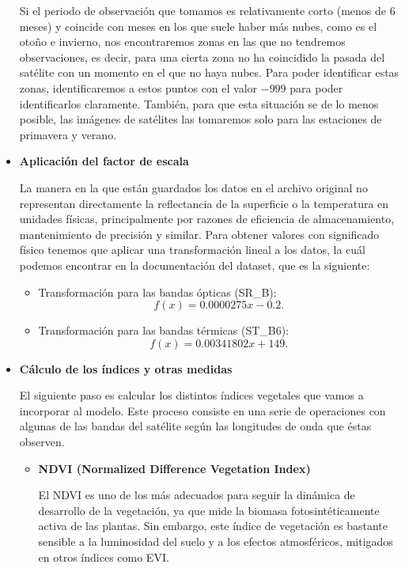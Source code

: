\begin{itemize}
    Si el periodo de observación que tomamos es relativamente corto (menos de 6 meses) y coincide con meses en los que suele haber más nubes, como es el otoño e invierno, nos encontraremos zonas en las que no tendremos observaciones, es decir, para una cierta zona no ha coincidido la pasada del satélite con un momento en el que no haya nubes. Para poder identificar estas zonas, identificaremos a estos puntos con el valor $-999$ para poder identificarlos claramente. También, para que esta situación se de lo menos posible, las imágenes de satélites las tomaremos solo para las estaciones de primavera y verano. 

    \item \textbf{Aplicación del factor de escala}

    La manera en la que están guardados los datos en el archivo original no representan directamente la reflectancia de la superficie o la temperatura en unidades físicas, principalmente por razones de eficiencia de almacenamiento, mantenimiento de precisión y similar. Para obtener valores con significado físico tenemos que aplicar una transformación lineal a los datos, la cuál podemos encontrar en la documentación del dataset, que es la siguiente:
    \begin{itemize}
        \item Transformación para las bandas ópticas (SR\_B):
        \[
        f(x) = 0.0000275x - 0.2.
        \]
        \item Transformación para las bandas térmicas (ST\_B6):
        \[
        f(x) = 0.00341802x + 149.
        \]
    \end{itemize}
    \item \textbf{Cálculo de los índices y otras medidas}\label{sec:indices}
    
    El siguiente paso es calcular los distintos índices vegetales que vamos a incorporar al modelo. Este proceso consiste en una serie de operaciones con algunas de las bandas del satélite según las longitudes de onda que éstas observen.

    \begin{itemize}
        \item \textbf{NDVI (Normalized Difference Vegetation Index)} \cite{eos_blog}
        
        El NDVI es uno de los más adecuados para seguir la dinámica de desarrollo de la vegetación, ya que mide la biomasa fotosintéticamente activa de las plantas. Sin embargo, este índice de vegetación es bastante sensible a la luminosidad del suelo y a los efectos atmosféricos, mitigados en otros índices como EVI.
        

\end{itemize}
\end{itemize}
